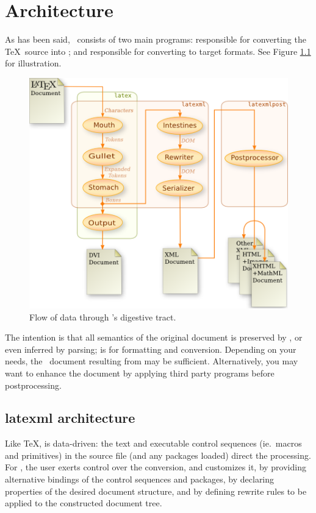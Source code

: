 \documentclass{book}
\begin{document}
\chapter{Architecture}\label{architecture}
As has been said, \LaTeXML\ consists of two main programs:
 responsible for converting the \TeX\ source into \XML;
and  responsible for converting to target formats.
See Figure \ref{fig:dataflow} for illustration.

\begin{figure}[tb]
\begin{center}
\includegraphics[width=\textwidth]{figures/digestion}
\end{center}
\caption{Flow of data through \LaTeXML's digestive tract.\label{fig:dataflow}}
\end{figure}

The intention is that all semantics of the original document is
preserved by , or even inferred by parsing;
 is for formatting and conversion.
Depending on your needs, the \LaTeXML\ document resulting from  may be
sufficient. Alternatively, you may want to enhance the document
by applying third party programs before postprocessing.

\section{latexml architecture}\label{latexmlarchitecture}
%
Like \TeX,  is data-driven: the text and executable control
sequences (ie.~macros and primitives)
in the source file (and any packages loaded) direct the processing.
For \LaTeXML, the user exerts control over the conversion, and customizes it, by 
providing alternative bindings of the control sequences and packages,
by declaring properties of the desired document structure,
and by defining rewrite rules to be applied to the constructed document tree.
\end{document}
